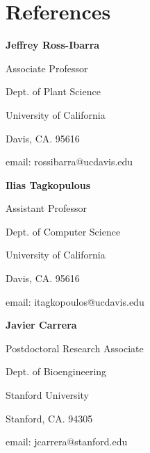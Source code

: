 \documentclass[letterpaper]{article}
\def\footerlink{https://github.com/arundurvasula/CV/blob/master/CV.pdf?raw=true}
\renewenvironment{itemize}{
  \begin{list}{}{
    \setlength{\leftmargin}{1.5em}
  }
}{
  \end{list}
}
\begin{document}
\section*{References}
\begin{itemize}
\item {\bf Jeffrey Ross-Ibarra}
\begin{itemize}
\item Associate Professor
\item Dept. of Plant Science
\item University of California
\item Davis, CA. 95616
\item email: rossibarra@ucdavis.edu 
\end{itemize}
\item {\bf Ilias Tagkopulous}
\begin{itemize}
\item Assistant Professor
\item Dept. of Computer Science
\item University of California
\item Davis, CA. 95616
\item email: itagkopoulos@ucdavis.edu 
\end{itemize}
\item {\bf Javier Carrera}
\begin{itemize}
\item Postdoctoral Research Associate
\item Dept. of Bioengineering
\item Stanford University
\item Stanford, CA. 94305
\item email: jcarrera@stanford.edu
\end{itemize}
\end{itemize}

\end{document}
